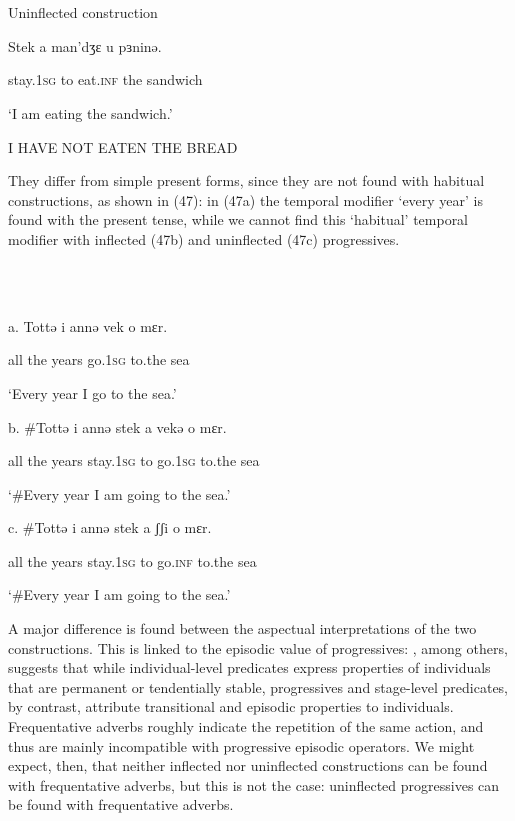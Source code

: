 \documentclass[output=paper]{langsci/langscibook}
\begin{document}
\ea%
    \label{ex:key:46}
    \gll\\
        \\
    \glt
    \z

          Uninflected construction

Stek     a  man’dʒɛ  u  pɜninə.     

stay.\textsc{1sg} to  eat.\textsc{inf} the   sandwich 

‘I am eating the sandwich.’

I HAVE NOT EATEN THE BREAD 

They differ from simple present forms, since they are not found with habitual constructions, as shown in (47): in (47a) the temporal modifier ‘every year’ is found with the present tense, while we cannot find this ‘habitual’ temporal modifier with inflected (47b) and uninflected (47c) progressives.

\ea%
    \label{ex:key:47}
    \gll\\
        \\
    \glt
    \z

          a.  Tottə  i  annə   vek     o   mɛr. 

     all  the   years  go.\textsc{1sg} to.the  sea

‘Every year I go to the sea.’

b.  \#Tottə   i  annə   stek     a  vekə     o  mɛr. 

    all    the   years  stay.\textsc{1sg} to   go.\textsc{1sg} to.the  sea

    ‘\#Every year I am going to the sea.’

c.   \#Tottə i  annə   stek    a   ʃʃi  o  mɛr.

    all   the   years  stay.\textsc{1sg} to  go.\textsc{inf} to.the  sea

    ‘\#Every year I am going to the sea.’

A major difference is found between the aspectual interpretations of the two constructions. This is linked to the episodic value of progressives: \citet{Chierchia1995}, among others, suggests that while individual-level predicates express properties of individuals that are permanent or tendentially stable, progressives and stage-level predicates, by contrast, attribute transitional and episodic properties to individuals. Frequentative adverbs roughly indicate the repetition of the same action, and thus are mainly incompatible with progressive episodic operators. We might expect, then, that neither inflected nor uninflected constructions can be found with frequentative adverbs, but this is not the case: uninflected progressives can be found with frequentative adverbs.
\end{document}
